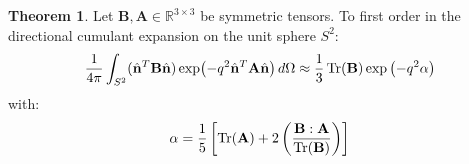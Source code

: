\documentclass[11pt,a4paper]{article}
\theoremstyle{definition}
\newtheorem{theorem}{Theorem}
\begin{document}
\begin{theorem}
Let $\mathbf{B}, \mathbf{A} \in \mathbb{R}^{3 \times 3}$ be symmetric tensors. To first order in the directional cumulant expansion on the unit sphere $S^2$:
\begin{equation}
\frac{1}{4\pi} \int_{S^2} (\hat{\mathbf{n}}^T \mathbf{B} \hat{\mathbf{n}}) \exp(-q^2 \hat{\mathbf{n}}^T \mathbf{A} \hat{\mathbf{n}}) \, d\Omega \approx \frac{1}{3} \Tr(\mathbf{B}) \exp\left( -q^2 \alpha \right)
\end{equation}
with:
\begin{equation}
\alpha = \frac{1}{5} \left[ \Tr(\mathbf{A}) + 2 \left( \frac{\mathbf{B} : \mathbf{A}}{\Tr(\mathbf{B})} \right) \right]
\end{equation}
\end{theorem}
\end{document}
